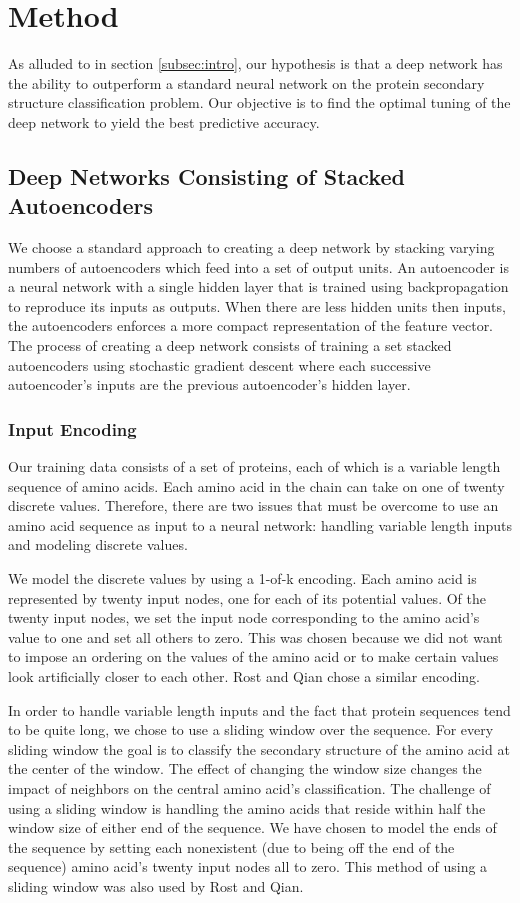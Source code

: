 \documentclass[letterpaper,twocolumn,12pt]{article}
\begin{document}
\section{Method}
As alluded to in section \ref{subsec:intro}, our hypothesis is that a deep network has the ability to outperform a standard neural network on the protein secondary structure classification
problem.
Our objective is to find the optimal tuning of the deep network to yield the best predictive accuracy.

\subsection{Deep Networks Consisting of Stacked Autoencoders}
We choose a standard approach to creating a deep network by stacking varying numbers of autoencoders \cite{Hinton} which feed into a set of output units.
An autoencoder is a neural network with a single hidden layer that is trained using backpropagation to reproduce its inputs as outputs.
When there are less hidden units then inputs, the autoencoders enforces a more compact representation of the feature vector.
The process of creating a deep network consists of training a set stacked autoencoders using stochastic gradient descent where each successive autoencoder's inputs are the previous autoencoder's hidden layer.

\subsubsection{Input Encoding}
Our training data consists of a set of proteins, each of which is a variable length sequence of amino acids.
Each amino acid in the chain can take on one of twenty discrete values.
Therefore, there are two issues that must be overcome to use an amino acid sequence as input to a neural network: handling variable length inputs and modeling discrete values.

We model the discrete values by using a 1-of-k encoding.
Each amino acid is represented by twenty input nodes, one for each of its potential values.
Of the twenty input nodes, we set the input node corresponding to the amino acid's value to one and set all others to zero.
This was chosen because we did not want to impose an ordering on the values of the amino acid or to make certain values look artificially closer to each other.
Rost and Qian chose a similar encoding.

In order to handle variable length inputs and the fact that protein sequences tend to be quite long, we chose to use a sliding window over the sequence.
For every sliding window the goal is to classify the secondary structure of the amino acid at the center of the window.
The effect of changing the window size changes the impact of neighbors on the central amino acid's classification.
The challenge of using a sliding window is handling the amino acids that reside within half the window size of either end of the sequence.
We have chosen to model the ends of the sequence by setting each nonexistent (due to being off the end of the sequence) amino acid's twenty input nodes all to zero.
This method of using a sliding window was also used by Rost and Qian.
\end{document}
